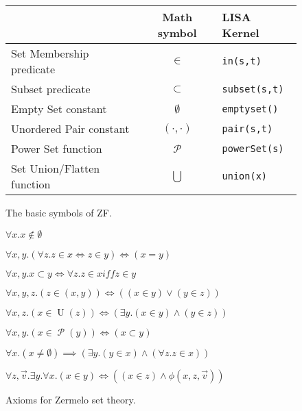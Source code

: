 \begin{figure}
\begin{center}
\begin{tabular}{l|c|l}
{} & Math symbol & LISA Kernel\\ \hline
Set Membership predicate & $\in$ & \lstinline$in(s,t)$\\
Subset predicate & $\subset$ & \lstinline$subset(s,t)$ \\
Empty Set constant & $\emptyset$ & \lstinline$emptyset()$ \\
Unordered Pair constant & $(\cdot, \cdot )$ & \lstinline$pair(s,t)$ \\
Power Set function & $\mathcal P$ & \lstinline$powerSet(s)$ \\
Set Union/Flatten function & $\bigcup$ & \lstinline$union(x)$ \\
\end{tabular}
\caption{The basic symbols of ZF.}
\label{fig:symbolszf}
\end{center}
\end{figure}

\begin{figure}
\begin{axz}\label{axz:empty}
$\forall x. x \notin \emptyset$
\end{axz}
\begin{axz}[extensionality]\label{axz:extensionality}
$\forall x, y. (\forall z. z \in x \iff z \in y) \iff (x = y)$
\end{axz}
\begin{axz}[extensionality]\label{axz:subset}
$\forall x, y. x\subset y \iff \forall z. z \in x iff z \in y$
\end{axz}
\begin{axz}[pair]\label{axz:pair}
$\forall x, y, z. (z \in (x, y)) \iff ((x \in y) \lor (y \in z))$
\end{axz}
\begin{axz}[union]\label{axz:union}
$\forall x, z. (x \in \operatorname{U}(z)) \iff (\exists y. (x \in y) \land (y \in z))$
\end{axz}
\begin{axz}[power]\label{axz:power}
$\forall x, y. (x \in \operatorname{\mathcal{P}}(y)) \iff (x \subset y)$
\end{axz}
\begin{axz}[foundation]\label{axz:foundation}
$\forall x. (x \neq \emptyset) \implies (\exists y. (y \in x) \land (\forall z. z \in x))$
\end{axz}
\begin{axz}\label{axz:comprehension}
$\forall z, \vec{v}. \exists y. \forall x. (x \in y) \iff ((x \in z) \land \phi(x, z, \vec{v}))$
\end{axz}
\caption{Axioms for Zermelo set theory.}
\label{fig:axiomsz}
\end{figure}

